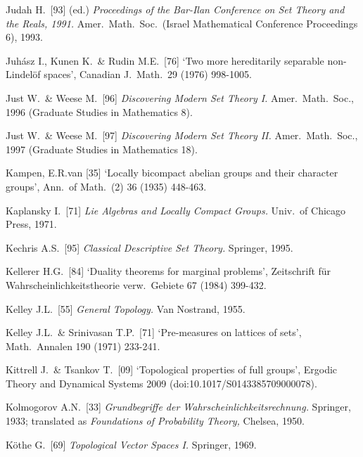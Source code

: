 {Judah H.\ [93] (ed.) {\it Proceedings of the Bar-Ilan Conference on Set
Theory and the Reals, 1991.} Amer.\ Math.\ Soc.\ (Israel Mathematical
Conference Proceedings 6), 1993.

Juh\'asz I., Kunen K.\ \& Rudin M.E.\ [76] `Two more hereditarily
separable non-Lindel\"of spaces', Canadian J.\ Math.\ 29 (1976)
998-1005.

Just W.\ \& Weese M.\ [96] {\it Discovering Modern Set Theory I.}  Amer.\ Math.\ Soc., 1996 (Graduate Studies in Mathematics 8).
\cmmnt{[4A1A.]}

Just W.\ \& Weese M.\ [97] {\it Discovering Modern Set Theory II.}  Amer.\ Math.\ Soc., 1997 (Graduate Studies in Mathematics 18).
\cmmnt{[\S4A1.]}

\medskip%

Kampen, E.R.van [35] `Locally bicompact abelian groups and their character groups',
Ann.\ of Math.\ (2) 36 (1935) 448-463.
\cmmnt{[445U.]}

Kaplansky I.\ [71] {\it Lie Algebras and Locally Compact Groups.}
Univ.\ of Chicago Press, 1971.
\cmmnt{[\S446 {\it notes.}]}

Kechris A.S.\ [95] {\it Classical Descriptive Set Theory.}  Springer,
1995.


Kellerer H.G.\ [84] `Duality theorems for marginal problems', Zeitschrift
f\"ur Wahrscheinlichkeitstheorie verw.\ Gebiete 67 (1984) 399-432.
\cmmnt{[457M.]}

Kelley J.L.\ [55] {\it General Topology.} Van Nostrand, 1955.
\cmmnt{[438R.]}

Kelley J.L.\ \& Srinivasan T.P.\ [71] `Pre-measures on lattices of sets',
Math.\ Annalen 190 (1971) 233-241.
\cmmnt{[413Xs.]}

Kittrell J.\ \& Tsankov T.\ [09] `Topological properties of full groups',
Ergodic Theory and Dynamical Systems 2009 (doi:10.1017/S0143385709000078).
\cmmnt{[494O, \S494 {\it notes}.]}

Kolmogorov A.N.\ [33] {\it Grundbegriffe der
Wahrscheinlichkeitsrechnung.}  Springer, 1933;  translated as {\it
Foundations of Probability Theory,}  Chelsea, 1950.
\cmmnt{[454D.]}

K\"othe G.\ [69] {\it Topological Vector Spaces I.}   Springer, 1969.
\cmmnt{[\S462 {\it notes\/}, \S4A4, 4A6C.]}

}
